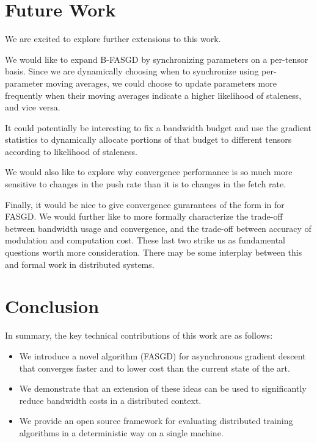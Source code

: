 \documentclass{article} %
\begin{document}
\vspace{-2.5mm}
\section{Future Work}
\vspace{-1mm}

We are excited to explore further extensions to this work.

We would like to expand B-FASGD by synchronizing parameters on a per-tensor basis.
Since we are dynamically choosing when to synchronize using per-parameter moving averages,
we could choose to update parameters more frequently when their moving averages
indicate a higher likelihood of staleness, and vice versa.

It could potentially be interesting to fix a bandwidth budget and use the gradient
statistics to dynamically allocate portions of that budget to different tensors
according to likelihood of staleness.

We would also like to explore why convergence performance is so much more sensitive
to changes in the push rate than it is to changes in the fetch rate.

Finally, it would be nice to give convergence gurarantees of the form in \cite{Lian} for FASGD.
We would further like to more formally characterize the trade-off between bandwidth usage and convergence,
and the trade-off between accuracy of modulation and computation cost.
These last two strike us as fundamental questions worth more consideration.
There may be some interplay between this and formal work in distributed systems.

\vspace{-2.5mm}
\section{Conclusion}
\vspace{-1mm}

In summary, the key technical contributions of this work are as follows:

\begin{itemize}

\item We introduce a novel algorithm (FASGD) for asynchronous gradient descent that converges faster and to lower cost than
the current state of the art. 

\item We demonstrate that an extension of these ideas can be used to significantly reduce bandwidth costs in a distributed context.

\item We provide an open source framework for evaluating distributed training algorithms in a deterministic way on a single machine.

\end{itemize}
\end{document}
